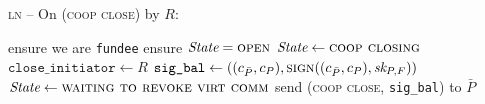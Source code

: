 \begin{center}
  \begin{processbox}{\textsc{ln} -- On (\textsc{coop close}) by $R$:}
    \begin{algorithmic}[1]
      \State ensure we are \texttt{fundee}
      \State ensure $\itistate = \textsc{open}$
      \State $\itistate \gets \textsc{coop closing}$
      \State $\texttt{close\_initiator} \gets R$
      \State $\texttt{sig\_bal} \gets ((c_{\bar{P}}, c_P),
      \textsc{sign}((c_{\bar{P}}, c_P), \textit{sk}_{P, F}))$
      \State $\itistate \gets \textsc{waiting to revoke virt comm}$
      \State send (\textsc{coop close}, \texttt{sig\_bal}) to $\bar{P}$
    \end{algorithmic}
  \end{processbox}
  \label{code:ln:coop-close-fundee}
\end{center} \ \\

